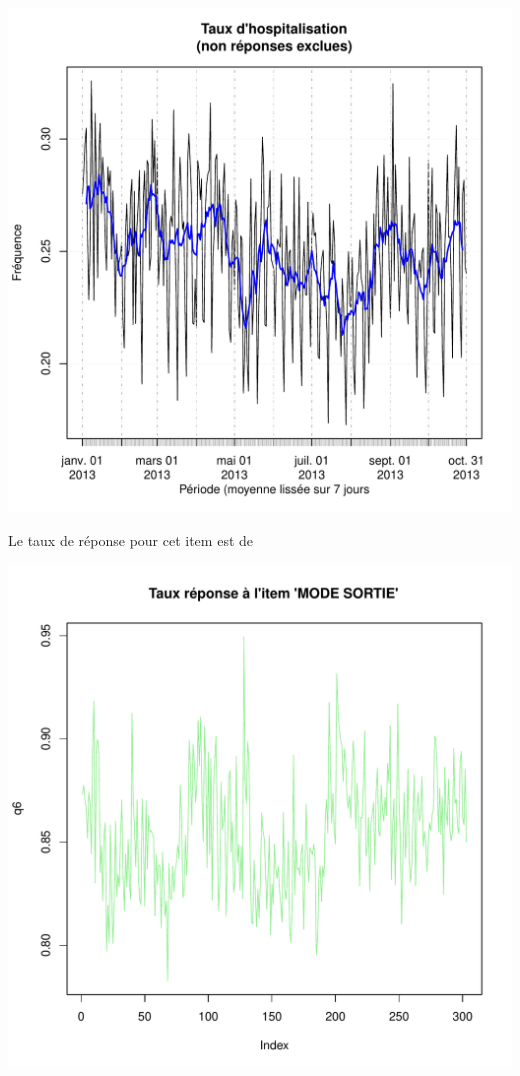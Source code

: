 \documentclass[12pt,english,french,twoside]{report}\usepackage[]{graphicx}\usepackage[]{color}
\makeatletter
\def\maxwidth{ %
  \ifdim\Gin@nat@width>\linewidth
    \linewidth
  \else
    \Gin@nat@width
  \fi
}
\makeatother
\begin{document}
\includegraphics[width=\maxwidth]{figure/hospit} 




Le taux de réponse pour cet item est de

\includegraphics[width=\maxwidth]{figure/retour_dom3} 
\end{document}
